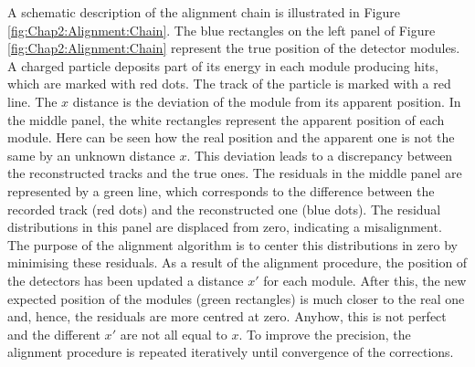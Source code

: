 A schematic description of the alignment chain is illustrated in Figure \ref{fig:Chap2:Alignment:Chain}.
The blue rectangles on the left panel of Figure \ref{fig:Chap2:Alignment:Chain} represent the true position of 
the detector modules. A charged particle deposits part of its energy in each module producing hits, 
which are marked with red dots. The track of the particle is marked with a red line. The $x$ distance
is the deviation of the module from its apparent position. In the middle panel, the white rectangles
represent the apparent position of each module. Here can be seen how the real position and the 
apparent one is not the same by an unknown distance $x$. This deviation leads to a discrepancy between 
the reconstructed tracks and the true ones. The residuals in the middle panel are represented by a green
line, which corresponds to the difference between the recorded track (red dots) and the reconstructed
one (blue dots). The residual distributions in this panel are displaced from zero, indicating a misalignment.
The purpose of the alignment algorithm is to center this distributions in zero by minimising these residuals.
As a result of the alignment procedure, the position of the detectors has been updated a distance $x'$ 
for each module. After this, the new expected position of the modules (green rectangles) is much closer to 
the real one and, hence, the residuals are more centred at zero. Anyhow, this is not perfect and the different
$x'$  are not all equal to $x$. To improve the precision, the alignment procedure is repeated iteratively until
convergence of the corrections.

